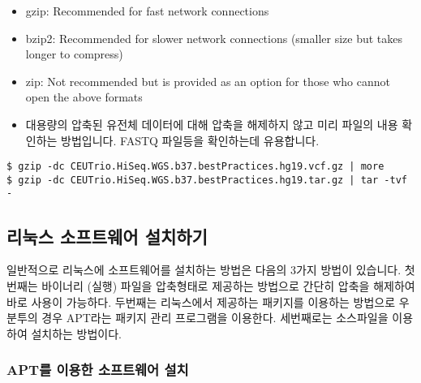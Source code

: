 \documentclass{article}
\begin{document}
\begin{itemize}
\item
  \begin{itemize}
   gzip: Recommended for fast network connections  
  \end{itemize}
\item
  \begin{itemize}
   bzip2: Recommended for slower network connections (smaller size but takes longer to compress)  
  \end{itemize}
\item
  \begin{itemize}
   zip: Not recommended but is provided as an option for those who cannot open the above formats  
  \end{itemize}  

\item
  \begin{itemize}
  대용량의 압축된 유전체 데이터에 대해 압축을 해제하지 않고 미리 파일의 내용 확인하는 방법입니다. FASTQ 파일등을 확인하는데 유용합니다.  
  \end{itemize}
\end{itemize}
\begin{lstlisting}[frame=single,style=Bash,xleftmargin=1.4cm,xrightmargin=1.4cm]
$ gzip -dc CEUTrio.HiSeq.WGS.b37.bestPractices.hg19.vcf.gz | more
$ gzip -dc CEUTrio.HiSeq.WGS.b37.bestPractices.hg19.tar.gz | tar -tvf -
\end{lstlisting}

\subsection{리눅스 소프트웨어 설치하기}
일반적으로 리눅스에 소프트웨어를 설치하는 방법은 다음의 3가지 방법이 있습니다. 첫번째는 바이너리 (실행) 파일을 압축형태로 제공하는 방법으로 간단히 압축을 해제하여 바로 사용이 가능하다. 두번째는 리눅스에서 제공하는 패키지를 이용하는 방법으로 우분투의 경우 APT라는 패키지 관리 프로그램을 이용한다. 세번째로는 소스파일을 이용하여 설치하는 방법이다.

\subsubsection{APT를 이용한 소프트웨어 설치}
\end{document}
